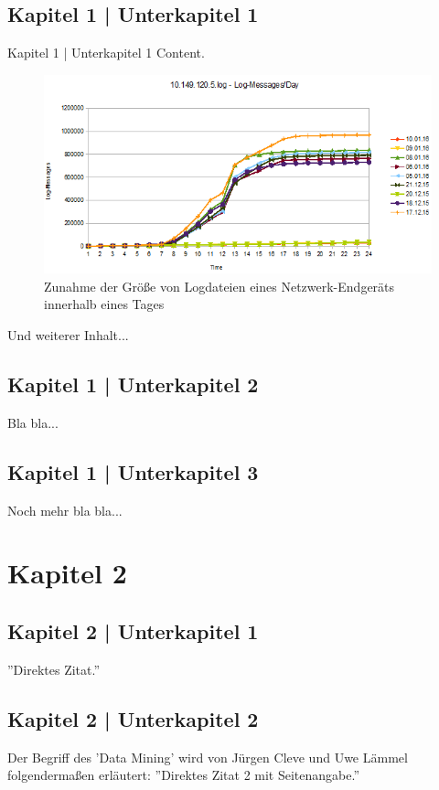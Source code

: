 \documentclass[deutsch]{lib/llncs/llncs}
\begin{document}
\subsection{Kapitel 1 | Unterkapitel 1}
Kapitel 1 | Unterkapitel 1 Content.\\
\begin{figure}
\centering
\includegraphics[scale=0.85]{img/DayAbsLogMsg.png}
\caption{Zunahme der Größe von Logdateien eines Netzwerk-Endgeräts innerhalb eines Tages}
\end{figure}
Und weiterer Inhalt...


\subsection{Kapitel 1 | Unterkapitel 2}
Bla bla...


\subsection{Kapitel 1 | Unterkapitel 3}
Noch mehr bla bla...


\section{Kapitel 2}
\subsection{Kapitel 2 | Unterkapitel 1}
''Direktes Zitat.''\cite{Zitat09}\\


\subsection{Kapitel 2 | Unterkapitel 2}
Der Begriff des 'Data Mining' wird von Jürgen Cleve und Uwe Lämmel folgendermaßen erläutert: ''Direktes Zitat 2 mit Seitenangabe.'' \cite[p. 2]{Zitat01} \\
\end{document}
